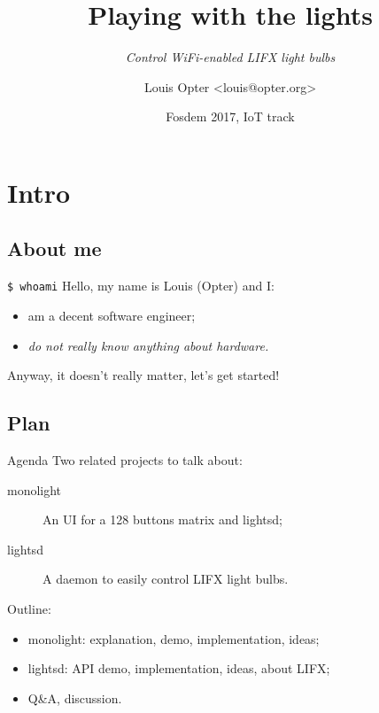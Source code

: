 \documentclass[utf8x,xcolor={usenames,svgnames}]{beamer}
\title{Playing with the lights}
\subtitle{\textit{Control WiFi-enabled LIFX light bulbs}}
\date{Fosdem 2017, IoT track}
\author{Louis Opter <louis@opter.org>}
\begin{document}
\begin{frame}\titlepage\end{frame}

\section{Intro}

\subsection{About me}

\begin{frame}{\LARGE{\texttt{\$ whoami}}}
Hello, my name is Louis (Opter) and I:\vspace{1em}
\begin{itemize}
\item am a decent software engineer;
\item \emph{do not really know anything about hardware.}
\end{itemize}
\vspace{1em}
Anyway, it doesn't really matter, let's get started!
\end{frame}

\subsection{Plan}

\begin{frame}{Agenda}
Two related projects to talk about:
\vspace{1em}
\begin{description}
\item[monolight] An UI for a 128 buttons matrix and lightsd;
\item[lightsd] A daemon to easily control LIFX light bulbs.
\end{description}
\pause
\vspace{2em}
Outline:
\vspace{1em}
\begin{itemize}
\item monolight: explanation, demo, implementation, ideas;
\item lightsd: API demo, implementation, ideas, about LIFX;
\item Q\&A, discussion.
\end{itemize}
\end{frame}
\end{document}
